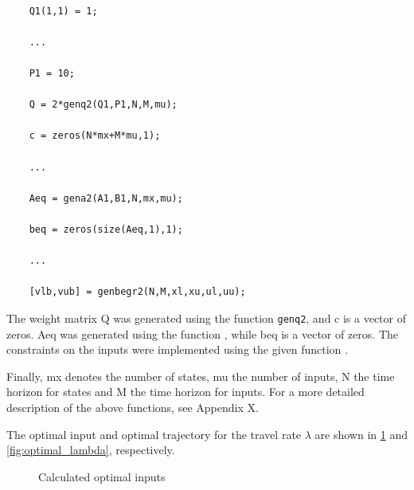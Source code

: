 \begin{lstlisting}

    Q1(1,1) = 1;

    ...

    P1 = 10;

    Q = 2*genq2(Q1,P1,N,M,mu);

    c = zeros(N*mx+M*mu,1);

    ...

    Aeq = gena2(A1,B1,N,mx,mu);

    beq = zeros(size(Aeq,1),1);

    ...

    [vlb,vub] = genbegr2(N,M,xl,xu,ul,uu);

\end{lstlisting}

The weight matrix Q was generated using the function \texttt{genq2}, and c is a vector of zeros. Aeq was generated using the function , while beq is a vector of zeros. The constraints on the inputs were implemented using the given function .



Finally, mx denotes the number of states, mu the number of inputs, N the time horizon for states and M the time horizon for inputs. For a more detailed description of the above functions, see Appendix X.



The optimal input and optimal trajectory for the travel rate $\lambda$ are shown in \cref{fig:optimal_inputs} and \cref{fig:optimal_lambda}, respectively. 




\begin{figure}[h]

    \centering


    \caption{Calculated optimal inputs}

    \label{fig:optimal_inputs}

\end{figure}



